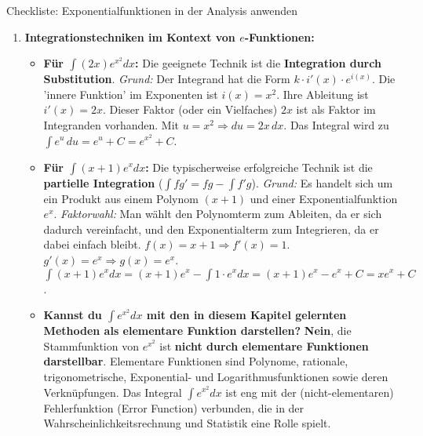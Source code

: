 \begin{loesungsumgebung}{Checkliste: Exponentialfunktionen in der Analysis anwenden}
\begin{enumerate}[label=(\alph*)]
    \item \textbf{Integrationstechniken im Kontext von $e$-Funktionen:}
    \begin{itemize}
        \item \textbf{Für $\int (2x) e^{x^2} dx$:}
        Die geeignete Technik ist die \textbf{Integration durch Substitution}.
        \textit{Grund:} Der Integrand hat die Form $k \cdot i'(x) \cdot e^{i(x)}$.
        Die 'innere Funktion' im Exponenten ist $i(x) = x^2$. Ihre Ableitung ist $i'(x) = 2x$. Dieser Faktor (oder ein Vielfaches) $2x$ ist als Faktor im Integranden vorhanden.
        Mit $u=x^2 \Rightarrow du = 2x \,dx$. Das Integral wird zu $\int e^u \,du = e^u + C = e^{x^2} + C$.

        \item \textbf{Für $\int (x+1) e^x dx$:}
        Die typischerweise erfolgreiche Technik ist die \textbf{partielle Integration} ($\int f g' = fg - \int f' g$).
        \textit{Grund:} Es handelt sich um ein Produkt aus einem Polynom $(x+1)$ und einer Exponentialfunktion $e^x$.
        \textit{Faktorwahl:} Man wählt den Polynomterm zum Ableiten, da er sich dadurch vereinfacht, und den Exponentialterm zum Integrieren, da er dabei einfach bleibt.
        $f(x) = x+1 \Rightarrow f'(x)=1$.
        $g'(x) = e^x \Rightarrow g(x)=e^x$.
        $\int (x+1)e^x dx = (x+1)e^x - \int 1 \cdot e^x dx = (x+1)e^x - e^x + C = xe^x + C$.

        \item \textbf{Kannst du $\int e^{x^2} dx$ mit den in diesem Kapitel gelernten Methoden als elementare Funktion darstellen?}
        \textbf{Nein}, die Stammfunktion von $e^{x^2}$ ist \textbf{nicht durch elementare Funktionen darstellbar}. Elementare Funktionen sind Polynome, rationale, trigonometrische, Exponential- und Logarithmusfunktionen sowie deren Verknüpfungen. Das Integral $\int e^{x^2} dx$ ist eng mit der (nicht-elementaren) Fehlerfunktion (Error Function) verbunden, die in der Wahrscheinlichkeitsrechnung und Statistik eine Rolle spielt.
    \end{itemize}


\end{enumerate}
\end{loesungsumgebung}
